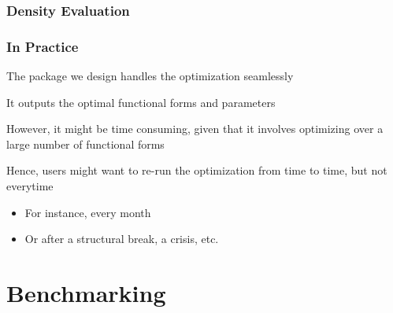 \documentclass{beamer}
\newenvironment{wideitemize}{\itemize\addtolength{\itemsep}{10pt}}{\enditemize}
\begin{document}
     
\begin{frame}
  \frametitle{Density Evaluation}
\end{frame}


\begin{frame}
  \frametitle{In Practice}
  \begin{wideitemize}
    \item The package we design handles the optimization seamlessly
    \item It outputs the optimal functional forms and parameters
    \item However, it might be time consuming, given that it involves optimizing over a large number of functional forms
    \item Hence, users might want to re-run the optimization from time to time, but not everytime
      \begin{itemize}
      \item For instance, every month
      \item Or after a structural break, a crisis, etc.
      \end{itemize}
  \end{wideitemize}
\end{frame}


\section{Benchmarking}
\end{document}
